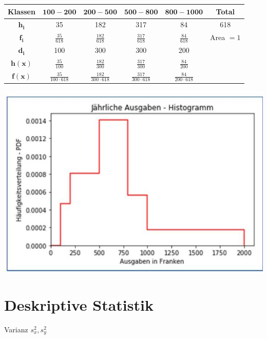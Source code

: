 \documentclass[10pt]{article}
\begin{document}
\begin{center}
\begin{tabular}{|c|c|c|c|c|c|}
\hline
Klassen & $\mathbf{1 0 0 - 2 0 0}$ & $\mathbf{2 0 0 - 5 0 0}$ & $\mathbf{5 0 0 - \mathbf { 8 0 0 }}$ & $\mathbf{8 0 0 - \mathbf { 1 0 0 0 }}$ & Total \\
\hline
$\boldsymbol{h}_{\boldsymbol{i}}$ & 35 & 182 & 317 & 84 & 618 \\
\hline
$\boldsymbol{f}_{\boldsymbol{i}}$ & $\frac{35}{618}$ & $\frac{182}{618}$ & $\frac{317}{618}$ & $\frac{84}{618}$ & Area $=1$ \\
\hline
$\boldsymbol{d}_{\boldsymbol{i}}$ & 100 & 300 & 300 & 200 &  \\
\hline
$\boldsymbol{h}(\boldsymbol{x})$ & $\frac{35}{100}$ & $\frac{182}{300}$ & $\frac{317}{300}$ & $\frac{84}{200}$ &  \\
\hline
$\boldsymbol{f}(\boldsymbol{x})$ & $\frac{35}{100 \cdot 618}$ & $\frac{182}{300 \cdot 618}$ & $\frac{317}{300 \cdot 618}$ & $\frac{84}{200 \cdot 618}$ &  \\
\hline
\end{tabular}
\end{center}

\begin{center}
\includegraphics[max width=\textwidth]{2024_12_29_e932069dd64ad17e4875g-02(1)}
\end{center}

\section*{Deskriptive Statistik}
Varianz $s_{x}^{2}, s_{y}^{2}$
\end{document}
